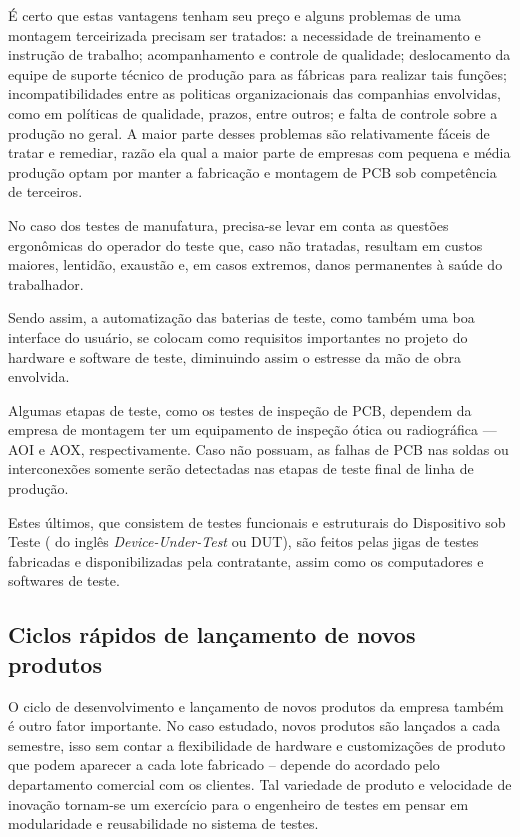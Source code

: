         É certo que estas vantagens tenham seu preço e alguns problemas de uma montagem terceirizada precisam ser tratados: a necessidade de treinamento e instrução de trabalho; acompanhamento e controle de qualidade; deslocamento da equipe de suporte técnico de produção para as fábricas para realizar tais funções; incompatibilidades entre as politicas organizacionais das companhias envolvidas, como em políticas de qualidade, prazos, entre outros; e falta de controle sobre a produção no geral. A maior parte desses problemas são relativamente fáceis de tratar e remediar, razão ela qual a maior parte de empresas com pequena e média produção optam por manter a fabricação e montagem de PCB sob competência de terceiros.
        
        No caso dos testes de manufatura, precisa-se levar em conta as questões ergonômicas do operador do teste que, caso não tratadas, resultam em custos maiores, lentidão, exaustão e, em casos extremos, danos permanentes à saúde do trabalhador. 
        
        Sendo assim, a automatização das baterias de teste, como também uma boa interface do usuário, se colocam como requisitos importantes no projeto do hardware e software de teste, diminuindo assim o estresse da mão de obra envolvida. 
        
        Algumas etapas de teste, como os testes de inspeção de PCB, dependem da empresa de montagem ter um equipamento de inspeção ótica ou radiográfica — AOI e AOX, respectivamente. Caso não possuam, as falhas de PCB nas soldas ou interconexões somente serão detectadas nas etapas de teste final de linha de produção.
        
        Estes últimos, que consistem de testes funcionais e estruturais do Dispositivo sob Teste ( do inglês \textit{Device-Under-Test} ou DUT), são feitos pelas jigas de testes fabricadas e disponibilizadas pela contratante, assim como os computadores e softwares de teste.
    \subsection{Ciclos rápidos de lançamento de novos produtos}
         
         O ciclo de desenvolvimento e lançamento de novos produtos da empresa também é outro fator importante. No caso estudado, novos produtos são lançados a cada semestre, isso sem contar a flexibilidade de hardware e customizações de produto que podem aparecer a cada lote fabricado -- depende do acordado pelo departamento comercial com os clientes. Tal variedade de produto e velocidade de inovação tornam-se um exercício para o engenheiro de testes em pensar em modularidade e reusabilidade no sistema de testes.
         

